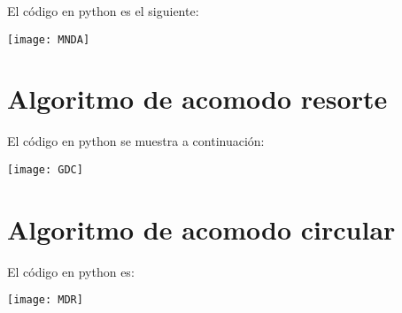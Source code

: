 \documentclass[10pt,a4paper]{article}
\begin{document}
El código en python es el siguiente:



\begin{center}

\texttt{[image: MNDA]}

\end{center}

\section{Algoritmo de acomodo resorte}

El código en python se muestra a continuación:



\begin{center}

\texttt{[image: GDC]}

\end{center}

\section{Algoritmo de acomodo circular}

El código en python es:



\begin{center}

\texttt{[image: MDR]}

\end{center}

 




\end{document}
